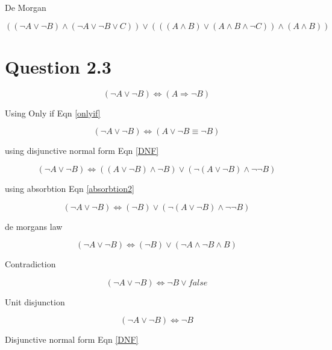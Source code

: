 \documentclass[10pt,a4paper]{article}
\begin{document}
De Morgan

\begin{equation}
 ((\neg A \vee \neg B) \wedge(\neg A\vee\neg B\vee C)) \vee ((( A\wedge B)\vee( A\wedge B\wedge\neg C))\wedge(A\wedge B))
\end{equation}



\section{Question 2.3}
\begin{equation}
(\neg A \vee \neg B )  \Leftrightarrow (A \Rightarrow \neg B)
\end{equation}

Using Only if Eqn \ref{onlyif}

\begin{equation}
(\neg A \vee \neg B )  \Leftrightarrow (A \vee \neg B \equiv \neg B)
\end{equation}

using disjunctive normal form Eqn \ref{DNF}


\begin{equation}
(\neg A \vee \neg B )  \Leftrightarrow ((A \vee \neg B) \wedge \neg B) \vee (\neg(A\vee \neg B) \wedge \neg\neg B)
\end{equation}

using absorbtion Eqn \ref{absorbtion2}


\begin{equation}
(\neg A \vee \neg B )  \Leftrightarrow ( \neg B) \vee (\neg(A\vee \neg B) \wedge \neg\neg B)
\end{equation}

de morgans law

\begin{equation}
(\neg A \vee \neg B )  \Leftrightarrow ( \neg B) \vee (\neg A \wedge \neg B \wedge B)
\end{equation}

Contradiction

\begin{equation}
(\neg A \vee \neg B )  \Leftrightarrow \neg B \vee false
\end{equation}

Unit disjunction 

\begin{equation}
(\neg A \vee \neg B )  \Leftrightarrow \neg B
\end{equation}

Disjunctive normal form Eqn \ref{DNF}
\end{document}
